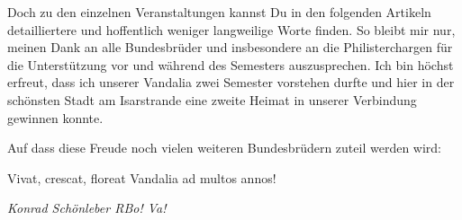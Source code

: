 \begin{multicols}{2}
Doch zu den einzelnen Veranstaltungen kannst Du in den folgenden Artikeln detailliertere und hoffentlich weniger langweilige Worte finden. So bleibt mir nur, meinen Dank an alle Bundesbrüder und insbesondere an die Philisterchargen für die Unterstützung vor und während des Semesters auszusprechen. Ich bin höchst erfreut, dass ich unserer Vandalia zwei Semester vorstehen durfte und hier in der schönsten Stadt am Isarstrande eine zweite Heimat in unserer Verbindung gewinnen konnte.  

Auf dass diese Freude noch vielen weiteren Bundesbrüdern zuteil werden wird:

Vivat, crescat, floreat Vandalia ad multos annos!
	\begin{flushright}
		\hfill\emph{Konrad Schönleber RBo! Va!}
	\end{flushright}
\end{multicols}

